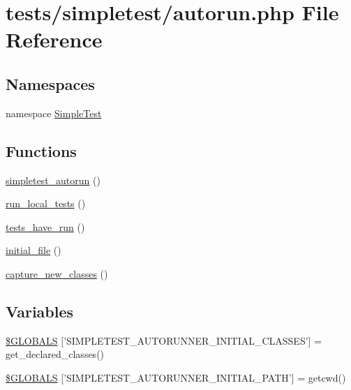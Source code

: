 \hypertarget{autorun_8php}{\section{tests/simpletest/autorun.php File Reference}
\label{autorun_8php}
}
\subsection*{Namespaces}
\begin{DoxyCompactItemize}
\item 
namespace \hyperlink{namespace_simple_test}{Simple\-Test}
\end{DoxyCompactItemize}
\subsection*{Functions}
\begin{DoxyCompactItemize}
\item 
\hyperlink{autorun_8php_ac24b70787a5417eb06e71938033c544a}{simpletest\-\_\-autorun} ()
\item 
\hyperlink{autorun_8php_ac18fe2857cb389573854618f3864d7ba}{run\-\_\-local\-\_\-tests} ()
\item 
\hyperlink{autorun_8php_a98d395a4e972ae76177c84b745d270c9}{tests\-\_\-have\-\_\-run} ()
\item 
\hyperlink{autorun_8php_a769e126758faa32f19d71ac470563969}{initial\-\_\-file} ()
\item 
\hyperlink{autorun_8php_a88dea67d2be2b08195a6476358893f0a}{capture\-\_\-new\-\_\-classes} ()
\end{DoxyCompactItemize}
\subsection*{Variables}
\begin{DoxyCompactItemize}
\item 
\hyperlink{autorun_8php_a380ff7541a5a78a52605392f33d8b29c}{\$\-G\-L\-O\-B\-A\-L\-S} \mbox{[}'S\-I\-M\-P\-L\-E\-T\-E\-S\-T\-\_\-\-A\-U\-T\-O\-R\-U\-N\-N\-E\-R\-\_\-\-I\-N\-I\-T\-I\-A\-L\-\_\-\-C\-L\-A\-S\-S\-E\-S'\mbox{]} = get\-\_\-declared\-\_\-classes()
\item 
\hyperlink{autorun_8php_a1f6ed0cf7b5f6e859b6def201fb5bdf7}{\$\-G\-L\-O\-B\-A\-L\-S} \mbox{[}'S\-I\-M\-P\-L\-E\-T\-E\-S\-T\-\_\-\-A\-U\-T\-O\-R\-U\-N\-N\-E\-R\-\_\-\-I\-N\-I\-T\-I\-A\-L\-\_\-\-P\-A\-T\-H'\mbox{]} = getcwd()
\end{DoxyCompactItemize}


